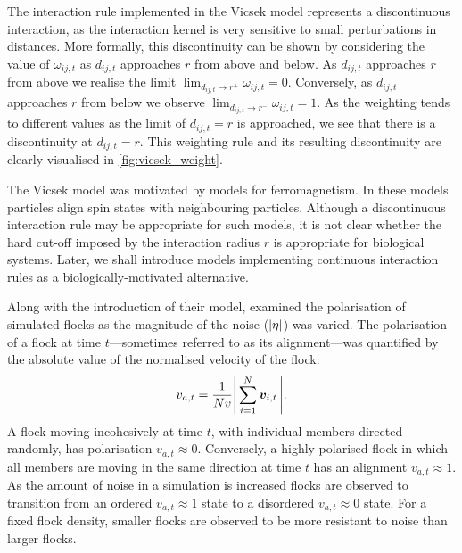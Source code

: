 The interaction rule implemented in the Vicsek model represents a discontinuous
interaction, as the interaction kernel is very sensitive to small perturbations
in distances. More formally, this discontinuity can be shown by considering the
value of $\omega_{ij, t}$ as $d_{ij,t}$ approaches $r$ from above and below. As
$d_{ij,t}$ approaches $r$ from above we realise the limit $\lim_{d_{ij,t}
\rightarrow r^+} \omega_{ij,t} = 0$. Conversely, as $d_{ij,t}$ approaches $r$
from below we observe $\lim_{d_{ij,t} \rightarrow r^-} \omega_{ij,t} = 1$. As
the weighting tends to different values as the limit of $d_{ij,t}=r$ is
approached, we see that there is a discontinuity at $d_{ij,t}=r$. This
weighting rule and its resulting discontinuity are clearly visualised in
\cref{fig:vicsek_weight}.

The Vicsek model was motivated by models for ferromagnetism. In these models
particles align spin states with neighbouring particles. Although a
discontinuous interaction rule may be appropriate for such models, it is not
clear whether the hard cut-off imposed by the interaction radius $r$ is
appropriate for biological systems. Later, we shall introduce models
implementing continuous interaction rules as a biologically-motivated
alternative.

Along with the introduction of their model, \cite{vicsek95} examined the
polarisation of simulated flocks as the magnitude of the noise ($\abs{\eta}$)
was varied. The polarisation of a flock at time $t$---sometimes referred to as its
alignment---was quantified by the absolute value of the normalised velocity of
the flock:
\begin{equation}
  \label{eq:alignment}
  v_{a,t} = \frac{1}{Nv} \abs{\,\sum_{i=1}^N \bm{v}_{i,t}\,}.
\end{equation}
A flock moving incohesively at time $t$, with individual members directed
randomly, has polarisation $v_{a,t}\approx0$. Conversely, a highly polarised
flock in which all members are moving in the same direction at time $t$ has an
alignment $v_{a,t}\approx1$. As the amount of noise in a simulation is
increased flocks are observed to transition from an ordered $v_{a,t}\approx1$
state to a disordered $v_{a,t}\approx0$ state. For a fixed flock density,
smaller flocks are observed to be more resistant to noise than larger flocks.

